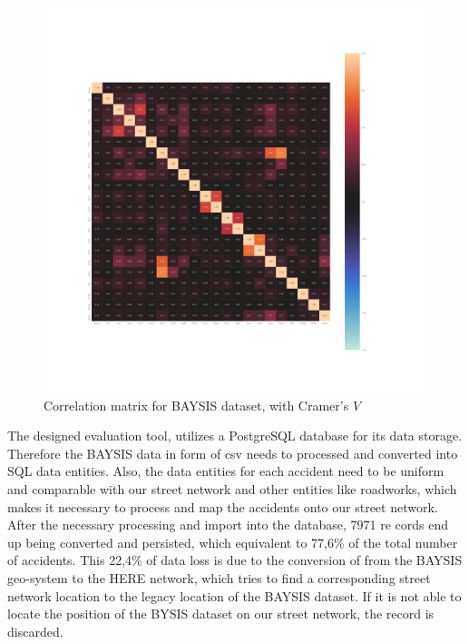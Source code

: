 \documentclass[a4paper,headsepline,footsepline,fontsize=11pt,BCOR=12mm,DIV=12]{report}
\begin{document}
\pagestyle{empty}
\begin{figure}[h]
	\centering
	\includegraphics[scale=0.4, trim=4cm 6cm 0cm 6cm]{../CorrAnalysis/data/BAYSIS/01_dataset/plots/baysis_dataset_corr_cramers}
	\caption{Correlation matrix for BAYSIS dataset, with Cramer's $V$}
	\label{img:correlation_matrix_dataset_cramers}
\end{figure}
\restoregeometry
\pagestyle{headings}

The designed evaluation tool, utilizes a PostgreSQL database for its data storage. Therefore the BAYSIS data in form of \acrfull{csv} needs to processed and converted into SQL data entities. Also, the data entities for each accident need to be uniform and comparable with our street network and other entities like roadworks, which makes it necessary to process and map the accidents onto our street network. After the necessary processing and import into the database, 7971 re cords end up being converted and persisted, which equivalent to 77,6\% of the total number of accidents. This 22,4\% of data loss is due to the conversion of from the BAYSIS geo-system to the HERE network, which tries to find a corresponding street network location to the legacy location of the BAYSIS dataset. If it is not able to locate the position of the BYSIS dataset on our street network, the record is discarded.
\end{document}
